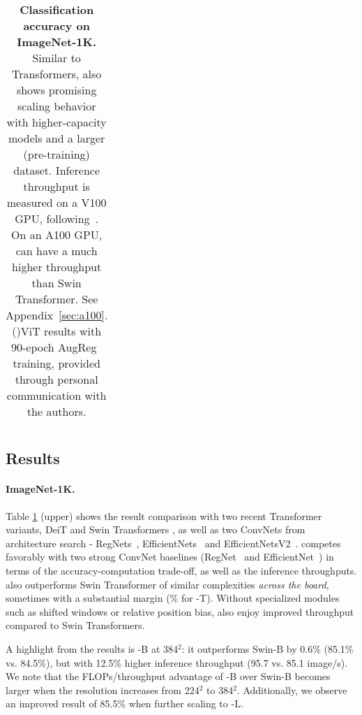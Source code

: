 \begin{table}[!htbp]
\begin{tabular}{lccccc}
\hline
\end{tabular}
\normalsize
\caption{\textbf{Classification accuracy on ImageNet-1K.} Similar to Transformers, \cnn{} also shows promising scaling behavior with higher-capacity models and a larger (pre-training) dataset. Inference throughput is measured on a V100 GPU, following~\cite{Liu2021swin}. On an A100 GPU, \cnn{} can have a much higher throughput than Swin Transformer. See Appendix~\ref{sec:a100}. (\Telefon)ViT results with 90-epoch AugReg~\cite{steiner2021train} training, provided through personal communication with the authors.}
\label{tab:imagenet-system}
\end{table}

\subsection{Results}
\label{subsec:imagenet-results}
\paragraph{ImageNet-1K.} Table \ref{tab:imagenet-system} (upper) shows the result comparison with two recent Transformer variants, DeiT \cite{Touvron2020} and Swin Transformers \cite{Liu2021swin}, as well as two ConvNets from architecture search - RegNets~\cite{Radosavovic2020designing}, EfficientNets~\cite{Tan2019efficientnet} and EfficientNetsV2~\cite{tan2021efficientnetv2}. \cnn{} competes favorably with two strong ConvNet baselines (RegNet~\cite{Radosavovic2020designing} and EfficientNet~\cite{Tan2019efficientnet}) in terms of the accuracy-computation trade-off, as well as the inference throughputs. \cnn{} also outperforms Swin Transformer of similar complexities \emph{across the board}, sometimes with a substantial margin (\% for \cnn{}-T). Without specialized modules such as shifted windows or relative position bias,  also enjoy improved throughput compared to Swin Transformers.

A highlight from the results is \cnn{}-B at 384$^2$: it outperforms Swin-B by 0.6\% (85.1\% vs. 84.5\%), but with 12.5\% higher inference throughput (95.7 vs. 85.1 image/s). We note that the FLOPs/throughput advantage of \cnn{}-B over Swin-B becomes larger when the resolution increases from 224$^2$ to 384$^2$. Additionally, we observe an improved result of 85.5\% when further scaling to \cnn{}-L.


